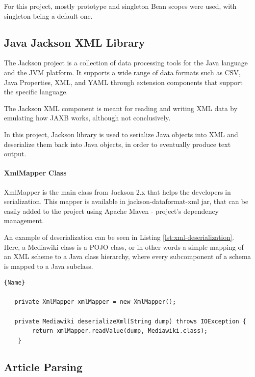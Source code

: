 \documentclass[thesis=M,english,hidelinks]{FITthesis}[2019/12/23]
\begin{document}
For this project, mostly prototype and singleton Bean scopes were used, with singleton being a default one.


\subsection{Java Jackson XML Library}\label{jackson_library}

The Jackson project is a collection of data processing tools for the Java language and the \gls{JVM} platform. It supports a wide range of data formats such as \gls{CSV}, Java Properties, XML, and \gls{YAML} through extension components that support the specific language.

The Jackson XML component is meant for reading and writing XML data by emulating how \gls{JAXB} works, although not conclusively.

In this project, Jackson library is used to serialize Java objects into XML and deserialize them back into Java objects, in order to eventually produce text output.

\paragraph{XmlMapper Class} 

XmlMapper is the main class from Jackson 2.x that helps the developers  in serialization. This mapper is available in jackson-dataformat-xml jar, that can be easily added to the project using Apache Maven - project's dependency management\cite{maven_project}.

An example of deserialization can be seen in Listing \ref{lst:xml-deserialization}. Here, a Mediawiki class is a \gls{POJO} class, or in other words a simple mapping of an XML scheme to a Java class hierarchy, where every subcomponent of a schema is mapped to a Java subclass.

\begin{lstlisting}[caption=Example of an XML Deserialization,frame=tlrb,  label = {lst:xml-deserialization}]{Name}
   
   private XmlMapper xmlMapper = new XmlMapper();
   
   private Mediawiki deserializeXml(String dump) throws IOException {
		return xmlMapper.readValue(dump, Mediawiki.class);
	}

\end{lstlisting}

\subsection{Article Parsing}\label{article_parsing}
\end{document}
